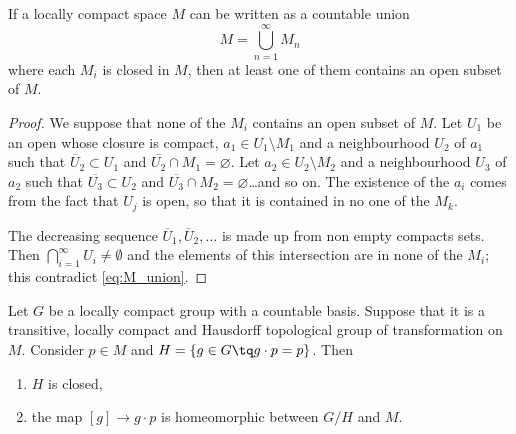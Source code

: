 \begin{lemma} \label{lem:categ}
If a locally compact space $M$ can be written as a countable union
\begin{equation}\label{eq:M_union}
   M=\bigcup_{n=1}^{\infty}M_n
\end{equation}
where each $M_i$ is closed in $M$, then at least one of them contains an open subset of $M$.
\end{lemma}

\begin{proof}
We suppose that none of the $M_i$ contains an open subset of $M$. Let $U_1$ be an open whose closure is compact, $a_1\in U_1\setminus M_1$ and a neighbourhood $U_2$ of $a_1$ such that $\overline{U}_2\subset U_1$ and $\overline{U_2}\cap M_1=\varnothing$. Let $a_2\in U_2\setminus M_2$ and a neighbourhood $U_3$ of $a_2$ such that $\overline{U_3}\subset U_2$ and $\overline{U_3}\cap M_2=\varnothing$\ldots and so on. The existence of the $a_i$ comes from the fact that $U_j$ is open, so that it is contained in no one of the $M_k$.

The decreasing sequence $\overline{U}_1,\overline{U}_2 ,\ldots$ is made up from non empty compacts sets. Then $\bigcap_{i=1}^{\infty}U_i\neq\emptyset$ and the elements of this intersection are in none of the $M_i$; this contradict \eqref{eq:M_union}.
\end{proof}


\begin{theorem} \label{tho:homeo_action}
Let $G$ be a locally compact group with a countable basis. Suppose that it is a transitive, locally compact and Hausdorff topological group of transformation on $M$. Consider $p\in M$ and $H=\{g\in G\tq g\cdot p=p\}$. Then
\begin{enumerate}
\item $H$ is closed,
\item the map $[g]\to g\cdot p$ is homeomorphic between  $G/H$ and $M$.
\end{enumerate}
\end{theorem}

